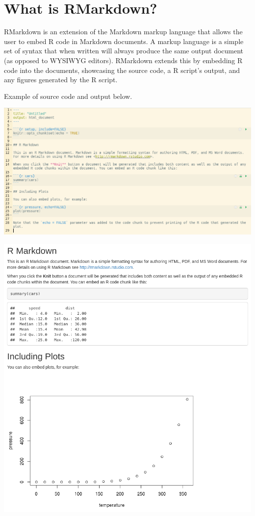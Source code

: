 \documentclass[
]{book}
\begin{document}
\hypertarget{what-is-rmarkdown}{%
\section{What is RMarkdown?}\label{what-is-rmarkdown}}

RMarkdown is an extension of the Markdown markup language that allows the user to embed R code in Markdown documents. A markup language is a simple set of syntax that when written will always produce the same output document (as opposed to WYSIWYG editors). RMarkdown extends this by embedding R code into the documents, showcasing the source code, a R script's output, and any figures generated by the R script.

Example of source code and output below.

\includegraphics{images/03-rmarkdown_1.png}

\includegraphics{images/03-rmarkdown_2.png}
\end{document}
